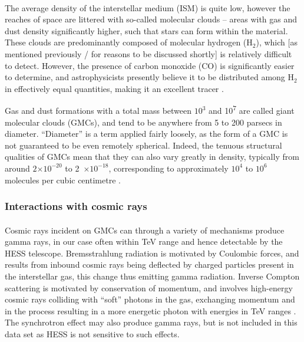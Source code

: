 \documentclass[a4paper, titlepage, oneside]{article}
\newcommand{\molec}[2]{\ensuremath{\text{#1}_{#2}}}
\newcommand{\e}[1]{\ensuremath{\times 10^{#1}}}
\newcommand{\smass}{\mathrm{M_\odot}}
\begin{document}
\begin{multicols}{2}
\paragraph{}
The average density of the interstellar medium (ISM) is quite low, however the reaches of space are littered with so-called molecular clouds -- areas with gas and dust density significantly higher, such that stars can form within the material. These clouds are predominantly composed of molecular hydrogen (\molec{H}{2}), which [as mentioned previously / for reasons to be discussed shortly] is relatively difficult to detect. However, the presence of carbon monoxide (CO) is significantly easier to determine, and astrophysicists presently believe it to be distributed among \molec{H}{2} in effectively equal quantities, making it an excellent tracer \parencite{Glover:2011}.

Gas and dust formations with a total mass between \(10^3\) and \unit{10^7}{\smass} are called giant molecular clouds (GMCs), and tend to be anywhere from 5 to 200 parsecs in diameter. \parencite{Murray:2011} ``Diameter'' is a term applied fairly loosely, as the form of a GMC is not guaranteed to be even remotely spherical. Indeed, the tenuous structural qualities of GMCs mean that they can also vary greatly in density, typically from around \(2\e{-20}\) to \unit{2\e{-18}}{\gram\usk\centi\metre\rpcubed}, corresponding to approximately \(10^4\) to \(10^6\) molecules per cubic centimetre \parencite{Ferriere:2001}.

\subsubsection{Interactions with cosmic rays}
\paragraph{}
Cosmic rays incident on GMCs can through a variety of mechanisms produce gamma rays, in our case often within TeV range and hence detectable by the HESS telescope. Bremsstrahlung radiation is motivated by Coulombic forces, and results from inbound cosmic rays being deflected by charged particles present in the interstellar gas, this change thus emitting gamma radiation. Inverse Compton scattering is motivated by conservation of momentum, and involves high-energy cosmic rays colliding with ``soft'' photons in the gas, exchanging momentum and in the process resulting in a more energetic photon with energies in TeV ranges \parencite{Ferriere:2001}. The synchrotron effect may also produce gamma rays, but is not included in this data set as HESS is not sensitive to such effects.


\end{multicols}
\end{document}
